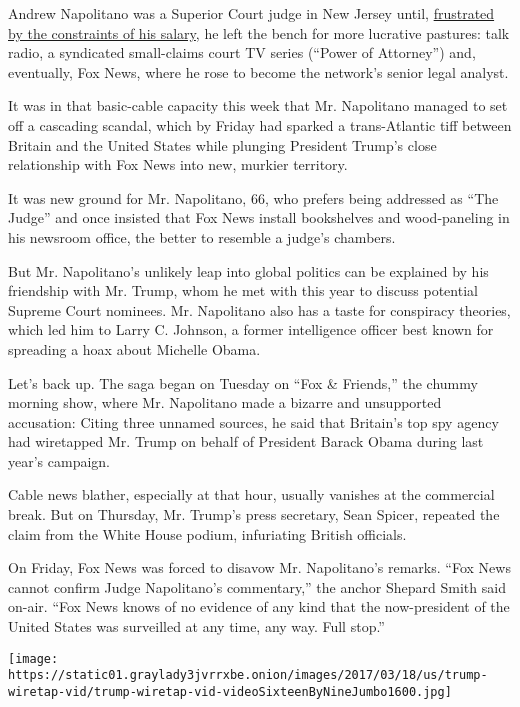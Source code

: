 Andrew Napolitano was a Superior Court judge in New Jersey until,
\href{http://www.nytimes3xbfgragh.onion/1995/02/23/nyregion/ban-on-taking-outside-fees-rankles-new-jersey-judges.html?pagewanted=all}{frustrated
by the constraints of his salary}, he left the bench for more lucrative
pastures: talk radio, a syndicated small-claims court TV series (``Power
of Attorney'') and, eventually, Fox News, where he rose to become the
network's senior legal analyst.

It was in that basic-cable capacity this week that Mr. Napolitano
managed to set off a cascading scandal, which by Friday had sparked a
trans-Atlantic tiff between Britain and the United States while plunging
President Trump's close relationship with Fox News into new, murkier
territory.

It was new ground for Mr. Napolitano, 66, who prefers being addressed as
``The Judge'' and once insisted that Fox News install bookshelves and
wood-paneling in his newsroom office, the better to resemble a judge's
chambers.

But Mr. Napolitano's unlikely leap into global politics can be explained
by his friendship with Mr. Trump, whom he met with this year to discuss
potential Supreme Court nominees. Mr. Napolitano also has a taste for
conspiracy theories, which led him to Larry C. Johnson, a former
intelligence officer best known for spreading a hoax about Michelle
Obama.

Let's back up. The saga began on Tuesday on ``Fox \& Friends,'' the
chummy morning show, where Mr. Napolitano made a bizarre and unsupported
accusation: Citing three unnamed sources, he said that Britain's top spy
agency had wiretapped Mr. Trump on behalf of President Barack Obama
during last year's campaign.

Cable news blather, especially at that hour, usually vanishes at the
commercial break. But on Thursday, Mr. Trump's press secretary, Sean
Spicer, repeated the claim from the White House podium, infuriating
British officials.

On Friday, Fox News was forced to disavow Mr. Napolitano's remarks.
``Fox News cannot confirm Judge Napolitano's commentary,'' the anchor
Shepard Smith said on-air. ``Fox News knows of no evidence of any kind
that the now-president of the United States was surveilled at any time,
any way. Full stop.''

\texttt{[image: https://static01.graylady3jvrrxbe.onion/images/2017/03/18/us/trump-wiretap-vid/trump-wiretap-vid-videoSixteenByNineJumbo1600.jpg]}

